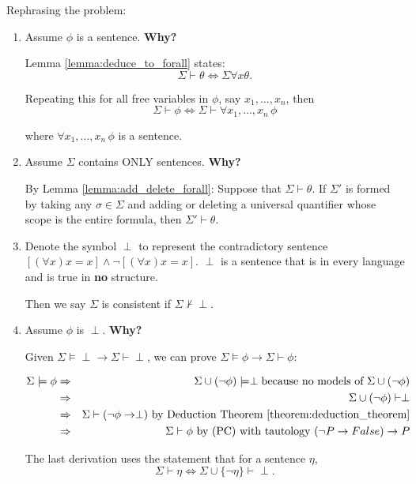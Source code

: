 \documentclass[11pt,letterpaper]{book}
\theoremstyle{definition}
\begin{document}
Rephrasing the problem:
\begin{enumerate}
\item{Assume $\phi$ is a sentence.}
\textbf{Why?}

Lemma \ref{lemma:deduce_to_forall} states:
$$\Sigma \vdash \theta \iff \Sigma \forall x \theta . $$

Repeating this for all free variables in $\phi$, say $x_1, \ldots, x_n$,
then
$$\Sigma \vdash \phi \iff \Sigma \vdash \forall x_1, \ldots, x_n \, \phi$$

where $\forall x_1, \ldots, x_n \, \phi$ is a sentence.

\item{Assume $\Sigma$ contains ONLY sentences.}
\textbf{Why? }

By Lemma \ref{lemma:add_delete_forall}: Suppose that $\Sigma \vdash
\theta$. If $\Sigma'$ is formed by taking any $\sigma \in \Sigma$ and
adding or deleting a universal quantifier whose scope is the entire
formula, then $\Sigma' \vdash \theta$.

\item{Denote the symbol $\perp$ to represent the contradictory sentence
$[(\forall x) x = x ]\land \lnot [ (\forall x) x = x ]$. $\perp$ is a
sentence that is in every language and is true in \textbf{no} structure.

Then we say $\Sigma$ is consistent if $\Sigma \not \vdash \perp$.
}

\item{Assume $\phi$ is $\perp$.}
\textbf{Why?}

Given $\Sigma \models \perp \rightarrow \Sigma \vdash \perp$, we can
prove $\Sigma \models \phi \rightarrow \Sigma \vdash \phi$:

\begin{eqnarray*}
\Sigma \models \phi &\Rightarrow & \Sigma \cup ( \lnot \phi ) \models
\perp \text{because no models of $\Sigma \cup (\lnot \phi)$} \\
&\Rightarrow & \Sigma \cup (\lnot \phi) \vdash \perp \\
&\Rightarrow & \Sigma \vdash (\lnot \phi \rightarrow \perp) \text{ by 
Deduction Theorem \ref{theorem:deduction_theorem}} \\
&\Rightarrow & \Sigma \vdash \phi \text{ by (PC) with tautology } (\lnot 
P \rightarrow False) \rightarrow P
\end{eqnarray*}

The last derivation uses the statement that for a sentence $\eta$, $$
\Sigma \vdash \eta \iff \Sigma \cup \{ \lnot \eta \} \vdash \perp .$$


\end{enumerate}
\end{document}
